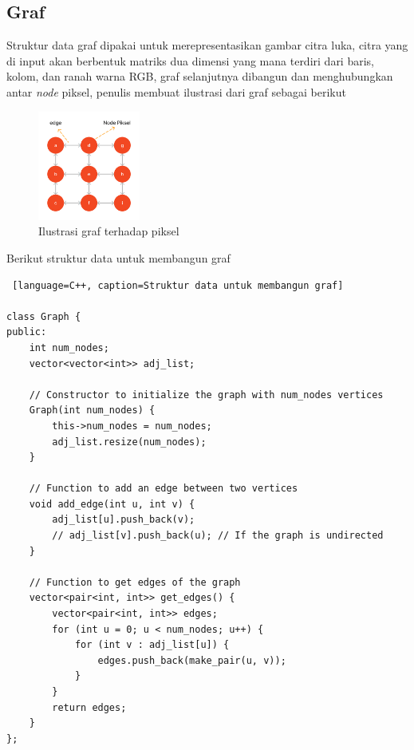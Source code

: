 
\subsection{Graf}
Struktur data graf dipakai untuk merepresentasikan gambar citra luka, citra yang
di input akan berbentuk matriks dua dimensi yang mana terdiri dari baris, kolom, 
dan ranah warna RGB, graf selanjutnya dibangun dan menghubungkan antar \emph{node}
piksel, penulis membuat ilustrasi dari graf sebagai berikut 

\begin{figure}[H]
	\centering{}
	\includegraphics[width=0.3\textwidth]{gambar/graf.png}
	\caption{Ilustrasi graf terhadap piksel}
\end{figure}

Berikut struktur data untuk membangun graf
\begin{lstlisting} [language=C++, caption=Struktur data untuk membangun graf]

class Graph {
public:
    int num_nodes;
    vector<vector<int>> adj_list;

    // Constructor to initialize the graph with num_nodes vertices
    Graph(int num_nodes) {
        this->num_nodes = num_nodes;
        adj_list.resize(num_nodes);
    }

    // Function to add an edge between two vertices
    void add_edge(int u, int v) {
        adj_list[u].push_back(v);
        // adj_list[v].push_back(u); // If the graph is undirected
    }

    // Function to get edges of the graph
    vector<pair<int, int>> get_edges() {
        vector<pair<int, int>> edges;
        for (int u = 0; u < num_nodes; u++) {
            for (int v : adj_list[u]) {
                edges.push_back(make_pair(u, v));
            }
        }
        return edges;
    }
};
\end{lstlisting}


